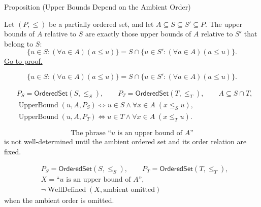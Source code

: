 
\begin{propositionbox}{Proposition (Upper Bounds Depend on the Ambient Order)}
\begin{proposition}
\label{prop:upper-bounds-ambient-order}
Let $(P,\leq)$ be a partially ordered set, and let
$A\subseteq S\subseteq S'\subseteq P$.  The upper bounds of $A$ relative to
$S$ are exactly those upper bounds of $A$ relative to $S'$ that belong to $S$:
\[
  \{u\in S:(\forall a\in A)(a\leq u)\}
  =
  S\cap\{u\in S':(\forall a\in A)(a\leq u)\}.
\]
\hyperref[prf:upper-bounds-ambient-order]{Go to proof.}
\end{proposition}
\end{propositionbox}

\begin{remark*}
\[
\{u\in S:(\forall a\in A)(a\leq u)\}
=
S\cap\{u\in S':(\forall a\in A)(a\leq u)\}.
\]
\end{remark*}

\begin{remark*}
\[
\begin{aligned}
&P_S=\mathsf{OrderedSet}(S,\le_S),\qquad
P_T=\mathsf{OrderedSet}(T,\le_T),\qquad A\subseteq S\cap T,\\
&\operatorname{UpperBound}(u,A,P_S)
\Longleftrightarrow
u\in S\land \forall x\in A\;(x\le_S u),\\
&\operatorname{UpperBound}(u,A,P_T)
\Longleftrightarrow
u\in T\land \forall x\in A\;(x\le_T u).
\end{aligned}
\]
\end{remark*}

\begin{remark*}
\[
\text{The phrase ``}u\text{ is an upper bound of }A\text{''}
\]
is not well-determined until the ambient ordered set and its order relation are fixed.
\end{remark*}

\begin{remark*}
\[
\begin{aligned}
&P_S=\mathsf{OrderedSet}(S,\le_S),\qquad
P_T=\mathsf{OrderedSet}(T,\le_T),\\
&X=\text{``$u$ is an upper bound of $A$''},\\
&\neg\operatorname{WellDefined}(X,\text{ambient omitted})
\end{aligned}
\]
when the ambient order is omitted.
\end{remark*}

